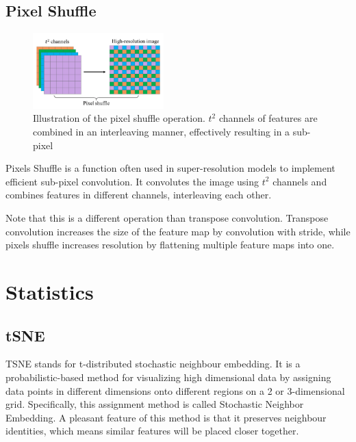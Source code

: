 \section{Pixel Shuffle}
\label{app:ml:pix_shuf}

\begin{figure}
    \centering
    \includegraphics[width=0.45\textwidth]{images/appendix/pixel_shuffle.png}
    \caption{Illustration of the pixel shuffle operation. $t^2$ channels of features are combined in an interleaving manner, effectively resulting in a sub-pixel}
    \label{fig:pixel_shuffle}
\end{figure}

Pixels Shuffle is a function often used in super-resolution models to implement efficient sub-pixel convolution. It convolutes the image using $t^2$ channels and combines features in different channels, interleaving each other. 

Note that this is a different operation than transpose convolution. Transpose convolution increases the size of the feature map by convolution with stride, while pixels shuffle increases resolution by flattening multiple feature maps into one. 



\chapter{Statistics}
\label{app:stat}

\section{tSNE}
\label{app:stat:tsne}
TSNE stands for t-distributed stochastic neighbour embedding. It is a probabilistic-based method for visualizing high dimensional data by assigning data points in different dimensions onto different regions on a 2 or 3-dimensional grid. Specifically, this assignment method is called Stochastic Neighbor Embedding\cite{hintonStochasticNeighborEmbedding2002}. A pleasant feature of this method is that it preserves neighbour identities, which means similar features will be placed closer together.

